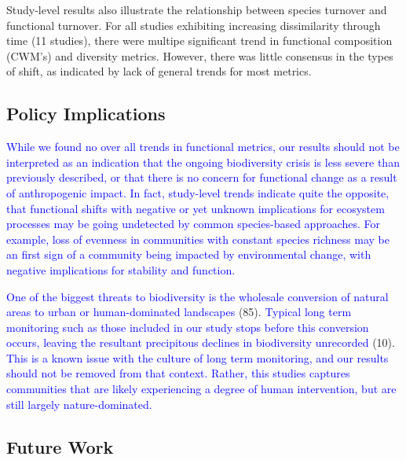 \documentclass{article}
\begin{document}
Study-level results also illustrate the relationship between species
turnover and functional turnover. For all studies exhibiting increasing
dissimilarity through time (11 studies), there were multipe significant
trend in functional composition (CWM's) and diversity metrics. However,
there was little consensus in the types of shift, as indicated by lack
of general trends for most metrics.

\hypertarget{policy-implications}{%
\subsection{Policy Implications}\label{policy-implications}}

\textcolor{blue}{While we found no over all trends in functional metrics, our results should not be interpreted as an indication that the ongoing biodiversity crisis is less severe than previously described, or that there is no concern for functional change as a result of anthropogenic impact. In fact, study-level trends indicate quite the opposite, that functional shifts with negative or yet unknown implications for ecosystem processes may be going undetected by common species-based approaches. For example, loss of evenness in communities with constant species richness may be an first sign of a community being impacted by environmental change, with negative implications for stability and function.}

\textcolor{blue}{One of the biggest threats to biodiversity is the wholesale conversion of natural areas to urban or human-dominated landscapes }(85).
\textcolor{blue}{Typical long term monitoring such as those included in our study stops before this conversion occurs, leaving the resultant precipitous declines in biodiversity unrecorded}
(10).
\textcolor{blue}{This is a known issue with the culture of long term monitoring, and our results should not be removed from that context. Rather, this studies captures communities that are likely experiencing a degree of human intervention, but are still largely nature-dominated.}

\hypertarget{future-work}{%
\subsection{Future Work}\label{future-work}}
\end{document}
